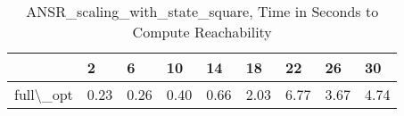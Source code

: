 \begin{table}
\centering
\caption{ANSR\_scaling\_with\_state\_square, Time in Seconds to Compute Reachability}
\label{ANSR_scaling_with_state_square_states_time}
\begin{tabular}{lllllllll}
\toprule
{} &     2 &     6 &    10 &    14 &    18 &    22 &    26 &    30 \\
\midrule
full\textbackslash \_opt &  0.23 &  0.26 &  0.40 &  0.66 &  2.03 &  6.77 &  3.67 &  4.74 \\
\bottomrule
\end{tabular}
\end{table}
